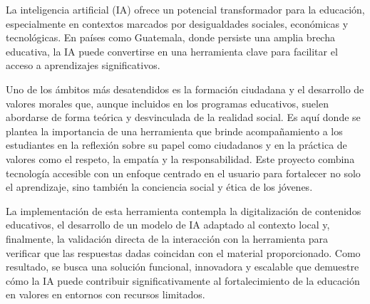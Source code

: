La inteligencia artificial (IA) ofrece un potencial transformador para la
educación, especialmente en contextos marcados por desigualdades sociales,
económicas y tecnológicas. En países como Guatemala, donde persiste una amplia
brecha educativa, la IA puede convertirse en una herramienta clave para
facilitar el acceso a aprendizajes significativos.

Uno de los ámbitos más desatendidos es la formación ciudadana y el desarrollo
de valores morales que, aunque incluidos en los programas educativos, suelen
abordarse de forma teórica y desvinculada de la realidad social. Es aquí donde
se plantea la importancia de una herramienta que brinde acompañamiento a los
estudiantes en la reflexión sobre su papel como ciudadanos y en la práctica de
valores como el respeto, la empatía y la responsabilidad. Este proyecto combina
tecnología accesible con un enfoque centrado en el usuario para fortalecer no
solo el aprendizaje, sino también la conciencia social y ética de los jóvenes.

La implementación de esta herramienta contempla la digitalización de contenidos
educativos, el desarrollo de un modelo de IA adaptado al contexto local y,
finalmente, la validación directa de la interacción con la herramienta para
verificar que las respuestas dadas coincidan con el material proporcionado.
Como resultado, se busca una solución funcional, innovadora y escalable que
demuestre cómo la IA puede contribuir significativamente al fortalecimiento de
la educación en valores en entornos con recursos limitados.